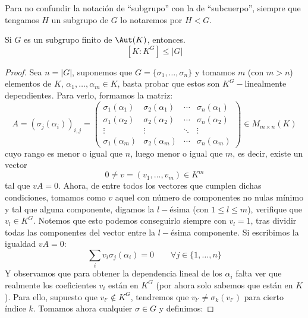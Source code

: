 \begin{notacion}
    Para no confundir la notación de ``subgrupo'' con la de ``subcuerpo'', siempre que tengamos $H$ un subgrupo de $G$ lo notaremos por $H < G$.
\end{notacion}

\begin{prop}[Artin]
    Si $G$ es un subgrupo finito de $\Aut(K)$, entonces.
    \begin{equation*}
        \left[K:K^G\right] \leq |G|
    \end{equation*}
    \begin{proof}
        Sea $n=|G|$, suponemos que $G = \{\sigma_1, \ldots, \sigma_n\}$ y tomamos $m$ (con $m>n$) elementos de $K$, $\alpha_1,\ldots,\alpha_m \in K$, basta probar que estos son $K^G-$linealmente dependientes. Para verlo, formamos la matriz:
        \begin{equation*}
            A = (\sigma_{j}(\alpha_i))_{i,j} = \left(\begin{array}{cccc}
                \sigma_1(\alpha_1) & \sigma_2(\alpha_1) & \cdots & \sigma_n(\alpha_1) \\
                \sigma_1(\alpha_2) & \sigma_2(\alpha_2) & \cdots & \sigma_n(\alpha_2) \\
                \vdots & \vdots & \ddots & \vdots \\
                \sigma_1(\alpha_m) & \sigma_2(\alpha_m) & \cdots & \sigma_n(\alpha_m) 
            \end{array}\right) \in  M_{m\times n}(K)
        \end{equation*}
        cuyo rango es menor o igual que $n$, luego menor o igual que $m$, es decir, existe un vector
        \begin{equation*}
            0\neq v = (v_1, \ldots, v_m) \in K^m
        \end{equation*}
        tal que $vA = 0$. Ahora, de entre todos los vectores que cumplen dichas condiciones, tomamos como $v$ aquel con número de componentes no nulas mínimo y tal que alguna componente, digamos la $l-$ésima (con $1\leq l\leq m$), verifique que $v_l \in K^G$. Notemos que esto podemos conseguirlo siempre con $v_l = 1$, tras dividir todas las componentes del vector entre la $l-$ésima componente. Si escribimos la igualdad $vA = 0$:
        \begin{equation*}
            \sum_i v_i \sigma_j(\alpha_i) = 0 \qquad \forall j \in \{1,\ldots,n\}
        \end{equation*}
        Y observamos que para obtener la dependencia lineal de los $\alpha_i$ falta ver que realmente los coeficientes $v_i$ están en $K^G$ (por ahora solo sabemos que están en $K$). Para ello, supuesto que $v_{l'}\notin K^G$, tendremos que $v_{l'} \neq \sigma_k(v_{l'})$ para cierto índice $k$. Tomamos ahora cualquier $\sigma\in G$ y definimos:

\end{proof}
\end{prop}
